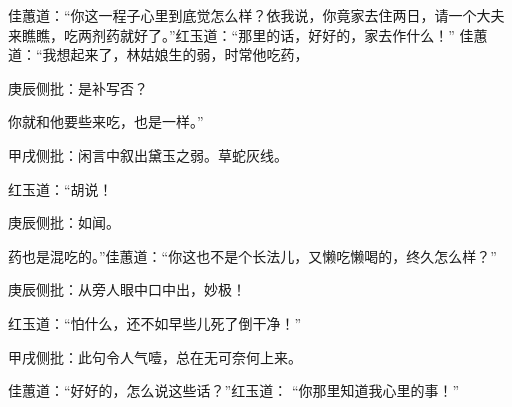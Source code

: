 \begin{parag}
    佳蕙道：“你这一程子心里到底觉怎么样？依我说，你竟家去住两日，请一个大夫来瞧瞧，吃两剂药就好了。”红玉道：“那里的话，好好的，家去作什么！” 佳蕙道：“我想起来了，林姑娘生的弱，时常他吃药，\begin{note}庚辰侧批：是补写否？\end{note}你就和他要些来吃，也是一样。”\begin{note}甲戌侧批：闲言中叙出黛玉之弱。草蛇灰线。\end{note}红玉道：“胡说！\begin{note}庚辰侧批：如闻。\end{note}药也是混吃的。”佳蕙道：“你这也不是个长法儿，又懒吃懒喝的，终久怎么样？”\begin{note}庚辰侧批：从旁人眼中口中出，妙极！\end{note}红玉道：“怕什么，还不如早些儿死了倒干净！”\begin{note}甲戌侧批：此句令人气噎，总在无可奈何上来。\end{note}佳蕙道：“好好的，怎么说这些话？”红玉道： “你那里知道我心里的事！”
\end{parag}


